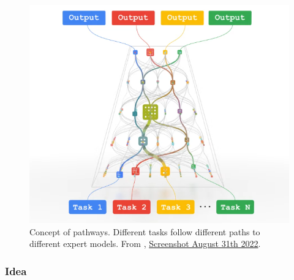 \documentclass[
]{krantz}
\begin{document}
\begin{figure}

{\centering \includegraphics[width=0.8\linewidth]{figures/03-03-multipurpose/Pathways} 

}

\caption{Concept of pathways. Different tasks follow different paths to different expert models. From \citet{Dean21}, \href{https://www.youtube.com/watch?v=Nf-d9CcEZ2w}{Screenshot August 31th 2022}.}\label{fig:pathways}
\end{figure}



\hypertarget{idea}{%
\subsubsection{Idea}\label{idea}}
\end{document}
